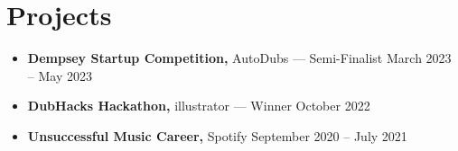 \documentclass[11pt]{article}
\newcommand{\resumeItem}[1]{
  \item\small{#1}
}
\begin{document}
\section{Projects}
\begin{itemize}[leftmargin=*]
  \resumeItem{\textbf{Dempsey Startup Competition,} AutoDubs — Semi-Finalist \hfill March 2023 – May 2023}
  \resumeItem{\textbf{DubHacks Hackathon,} illustrator — Winner \hfill October 2022}
  \resumeItem{\textbf{Unsuccessful Music Career,} Spotify \hfill September 2020 – July 2021}
\end{itemize}
\end{document}
